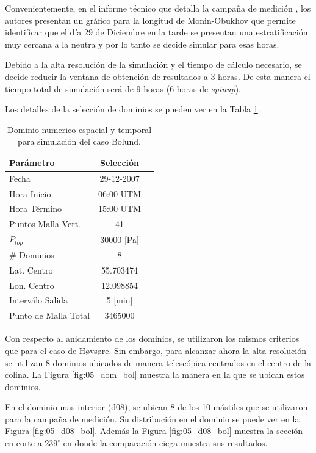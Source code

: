 Convenientemente, en el informe técnico que detalla la campaña de medición \cite{3d4285ac04444eb3b9775baf9af052c6}, los autores presentan un gráfico para la longitud de Monin-Obukhov que permite identificar que el día 29 de Diciembre en la tarde se presentan una estratificación muy cercana a la neutra y por lo tanto se decide simular para esas horas.

Debido a la alta resolución de la simulación y el tiempo de cálculo necesario, se decide reducir la ventana de obtención de resultados a 3 horas. De esta manera el tiempo total de simulación será de 9 horas (6 horas de \emph{spinup}).

Los detalles de la selección de dominios se pueden ver en la Tabla \ref{tab:05_config_bol}.

\begin{table}[h!]
	\caption{Dominio numerico espacial y temporal para simulación del caso Bolund.}\label{tab:05_config_bol}
	\centering\footnotesize
	\begin{tabular}{lcc}
		\toprule
		Parámetro & Selección \\
		\midrule
		Fecha	 	 & 29-12-2007   \\
		Hora Inicio	 	 & 06:00 UTM\\
		Hora Término	 		 & 15:00 UTM\\
		Puntos Malla Vert.	 	 & 41   \\
		$P_{top}$ 	& 30000 [Pa]\\
		\# Dominios	& 8   \\
		Lat. Centro	& 55.703474   \\
		Lon. Centro	& 12.098854   \\
		Interválo Salida & 5 [min]\\
		Punto de Malla Total & 3465000\\
		\bottomrule
	\end{tabular}
\end{table}

Con respecto al anidamiento de los dominios, se utilizaron los mismos criterios que para el caso de Høvsøre. Sin embargo, para alcanzar ahora la alta resolución se utilizan 8 dominios ubicados de manera telescópica centrados en el centro de la colina. La Figura \ref{fig:05_dom_bol} muestra la manera en la que se ubican estos dominios.

En el dominio mas interior (d08), se ubican 8 de los 10 mástiles que se utilizaron para la campaña de medición. Su distribución en el dominio se puede ver en la Figura \ref{fig:05_d08_bol}. Además la Figura \ref{fig:05_d08_bol} muestra la sección en corte a $239^\circ$ en donde la comparación ciega muestra sus resultados.

